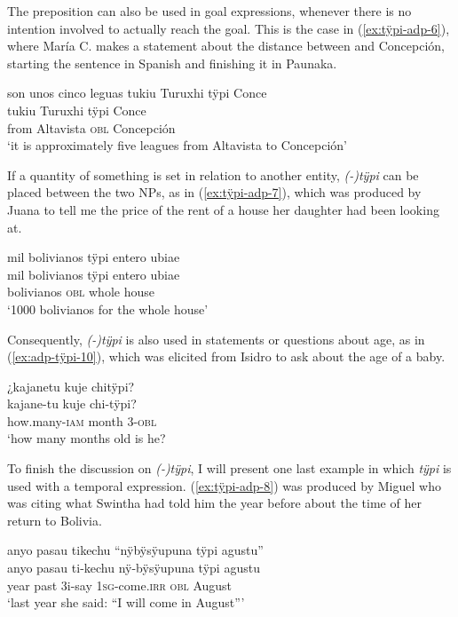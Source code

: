 The preposition can also be used in goal expressions, whenever there is no intention involved to actually reach the goal. This is the case in (\ref{ex:tÿpi-adp-6}), where María C. makes a statement about the distance between  and Concepción, starting the sentence in Spanish and finishing it in Paunaka.%

\ea\label{ex:tÿpi-adp-6}
\begingl
\glpreamble son unos cinco leguas tukiu Turuxhi tÿpi Conce\\
 tukiu Turuxhi tÿpi Conce\\
 from Altavista \textsc{obl} Concepción\\
\glft ‘it is approximately five leagues from Altavista to Concepción’
\endgl
\trailingcitation{[cux-c120414ls-1.159]}
\xe

If a quantity of something is set in relation to another entity, \textit{(-)tÿpi} can be placed between the two NPs, as in (\ref{ex:tÿpi-adp-7}), which was produced by Juana to tell me the price of the rent of a house her daughter had been looking at.

\ea\label{ex:tÿpi-adp-7}
\begingl
\glpreamble mil bolivianos tÿpi entero ubiae \\
\gla mil bolivianos tÿpi entero ubiae\\
 bolivianos \textsc{obl} whole house\\
\glft ‘1000 bolivianos for the whole house’
\endgl
\trailingcitation{[jxx-p120430l-1.368-369]}
\xe

Consequently, \textit{(-)tÿpi} is also used in statements or questions about age, as in (\ref{ex:adp-tÿpi-10}), which was elicited from Isidro to ask about the age of a baby.

\ea\label{ex:adp-tÿpi-10}
\begingl
\glpreamble ¿kajanetu kuje chitÿpi?\\
\gla kajane-tu kuje chi-tÿpi?\\
\glb how.many-\textsc{iam} month 3-\textsc{obl}\\
\glft ‘how many months old is he?
\endgl
\trailingcitation{[dxx-d120416s.071]}
\xe

To finish the discussion on \textit{(-)tÿpi}, I will present one last example in which \textit{tÿpi} is used with a temporal expression. (\ref{ex:tÿpi-adp-8}) was produced by Miguel who was citing what Swintha had told him the year before about the time of her return to Bolivia.

\ea\label{ex:tÿpi-adp-8}
\begingl
\glpreamble anyo pasau tikechu “nÿbÿsÿupuna tÿpi agustu”\\
\gla anyo pasau ti-kechu nÿ-bÿsÿupuna tÿpi agustu\\
\glb year past 3i-say 1\textsc{sg}-come.\textsc{irr} \textsc{obl} August\\
\glft ‘last year she said: “I will come in August”’
\endgl
\trailingcitation{[mxx-d110813s-2.057]}
\xe

